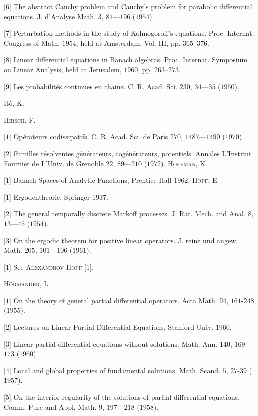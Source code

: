 [$6$] The abstract Cauchy problem and Cauchy's problem for parabolic differential equations. J. d'Analyse Math. $3$, $81$---$196$ ($1954$). 

[$7$] Perturbation methods in the study of Kolmogoroff's equations. Proc. Internat. Congress of Math. $1954$, held at Amsterdam, Vol. III, pp. $365$--$376$. 

[$8$] Linear differential equations in Banach algebras. Proc. Internat. Symposium on Linear Analysis, held at Jerusalem, $1960$, pp. $263$--$273$. 

[$9$] Les probabilités continues en chaine. C. R. Acad. Sci. $230$, $34$---$35$ ($1950$). 

Itô, K. 

\textsc{Hirsch}, F. 

[$1$] Opérateurs codissipatifs. C. R. Acad. Sci. de Paris $270$, $1487$---$1490$ ($1970$). 

[$2$] Familles résolventes générateurs, cogénérateurs, potentiels. Annales L'Institut Fournier de L'Univ. de Grenoble $22$, $89$---$210$ ($1972$). \textsc{Hoffman}, K. 

[$1$] Banach Spaces of Analytic Functions, Prentice-Hall $1962$. \textsc{Hopf}, E. 

[$1$] Ergodentheorie, Springer $1937$. 

[$2$] The general temporally discrete Markoff processes. J. Rat. Mech. and Anal. $8$, $13$---$45$ ($1954$). 

[$3$] On the ergodic theorem for positive linear operators. J. reine und angew. Math. $205$, $101$---$106$ ($1961$). 


[$1$] See \textsc{Alexandrov}-\textsc{Hopf} [$1$]. 

\textsc{Hörmander}, L. 

[$1$] On the theory of general partial differential operators. Acta Math. $94$, $161$-$248$ ($1955$). 

[$2$] Lectures on Linear Partial Differential Equations, Stanford Univ. $1960$. 

[$3$] Linear partial differential equations without solutions. Math. Ann. $140$, $169$-$173$ ($1960$). 

[$4$] Local and global properties of fundamental solutions. Math. Scand. $5$, $27$-$39$ ($1957$). 

[$5$] On the interior regularity of the solutions of partial differential equations. Comm. Pure and Appl. Math. $9$, $197$---$218$ ($1958$). 


